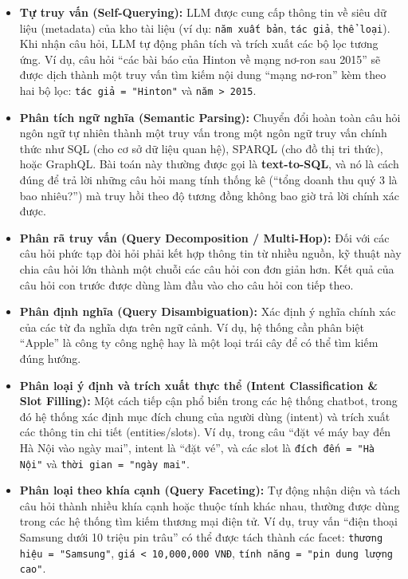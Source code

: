 \begin{itemize}
	\item \textbf{Tự truy vấn (Self-Querying):} 
	LLM được cung cấp thông tin về siêu dữ liệu (metadata) của kho tài liệu (ví dụ: \texttt{năm xuất bản}, \texttt{tác giả}, \texttt{thể loại}). Khi nhận câu hỏi, LLM tự động phân tích và trích xuất các bộ lọc tương ứng. Ví dụ, câu hỏi “các bài báo của Hinton về mạng nơ-ron sau 2015” sẽ được dịch thành một truy vấn tìm kiếm nội dung “mạng nơ-ron” kèm theo hai bộ lọc: \texttt{tác giả = "Hinton"} và \texttt{năm > 2015}.
	
	\item \textbf{Phân tích ngữ nghĩa (Semantic Parsing):}
	Chuyển đổi hoàn toàn câu hỏi ngôn ngữ tự nhiên thành một truy vấn trong một ngôn ngữ truy vấn chính thức như SQL (cho cơ sở dữ liệu quan hệ), SPARQL (cho đồ thị tri thức), hoặc GraphQL. Bài toán này thường được gọi là \textbf{text-to-SQL}, và nó là cách đúng để trả lời những câu hỏi mang tính thống kê (“tổng doanh thu quý 3 là bao nhiêu?”) mà truy hồi theo độ tương đồng không bao giờ trả lời chính xác được.
	
	\item \textbf{Phân rã truy vấn (Query Decomposition / Multi-Hop):}
	Đối với các câu hỏi phức tạp đòi hỏi phải kết hợp thông tin từ nhiều nguồn, kỹ thuật này chia câu hỏi lớn thành một chuỗi các câu hỏi con đơn giản hơn. Kết quả của câu hỏi con trước được dùng làm đầu vào cho câu hỏi con tiếp theo.
	
	\item \textbf{Phân định nghĩa (Query Disambiguation):}
	Xác định ý nghĩa chính xác của các từ đa nghĩa dựa trên ngữ cảnh. Ví dụ, hệ thống cần phân biệt “Apple” là công ty công nghệ hay là một loại trái cây để có thể tìm kiếm đúng hướng.
	
	\item \textbf{Phân loại ý định và trích xuất thực thể (Intent Classification \& Slot Filling):}
	Một cách tiếp cận phổ biến trong các hệ thống chatbot, trong đó hệ thống xác định mục đích chung của người dùng (intent) và trích xuất các thông tin chi tiết (entities/slots). Ví dụ, trong câu “đặt vé máy bay đến Hà Nội vào ngày mai”, intent là “đặt vé”, và các slot là \texttt{đích đến = "Hà Nội"} và \texttt{thời gian = "ngày mai"}.
	
	\item \textbf{Phân loại theo khía cạnh (Query Faceting):}
	Tự động nhận diện và tách câu hỏi thành nhiều khía cạnh hoặc thuộc tính khác nhau, thường được dùng trong các hệ thống tìm kiếm thương mại điện tử. Ví dụ, truy vấn “điện thoại Samsung dưới 10 triệu pin trâu” có thể được tách thành các facet: \texttt{thương hiệu = "Samsung"}, \texttt{giá < 10,000,000 VNĐ}, \texttt{tính năng = "pin dung lượng cao"}.
\end{itemize}

